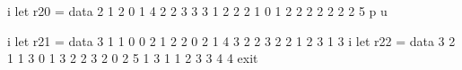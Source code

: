 i let r20 = data 2 1 2 0 1 4 2 2 3 3 3 1 2 2 2 1 0 1 2 2 2 2 2 2 2 5            
p                                                                               
u                                                                               
                                                                                
i let r21 = data 3 1 1 0 0 2 1 2 2 0 2 1 4 3 2 2 3 2 2 1 2 3 1 3                
i let r22 = data 3 2 1 1 3 0 1 3 2 2 3 2 0 2 5 1 3 1 1 2 3 3 4 4                
exit                                                                            
